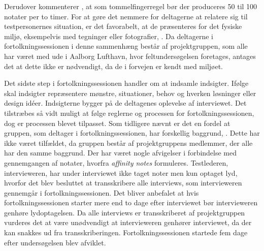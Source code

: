%
Derudover kommenterer \textcite[s. 116]{Book:CIInterpretationSession},  at som tommelfingerregel bør der produceres 50 til 100 notater per to timer. For at gøre det nemmere for deltagerne at relatere sig til testpersonernes situation, er det favorabelt, at de præsenteres for det fysiske miljø, eksempelvis med tegninger eller fotografier, \parencite[s. 119]{Book:CIInterpretationSession}. Da deltagerne i fortolkningssessionen i denne sammenhæng består af projektgruppen, som alle har været med ude i Aalborg Lufthavn, hvor feltundersøgelsen foretages, antages det at dette ikke er nødvendigt, da de i forvejen er kendt med miljøet. 

Det sidste step i fortolkningssessionen handler om at indsamle indsigter. Ifølge \textcite[s. 119]{Book:CIInterpretationSession} skal indsigter repræsentere mønstre, situationer, behov og hverken løsninger eller design idéer. Indsigterne bygger på de deltagenes oplevelse af interviewet. \blankline
%
Det tilstræbes så vidt muligt at følge reglerne og processen for fortolkningssessionen, dog er processen blevet tilpasset. Som tidligere nævnt er det en fordel at gruppen, som deltager i fortolkningssessionen, har forskellig baggrund, \parencite[s. 104]{Book:CIInterpretationSession}. Dette har ikke været tilfældet, da gruppen består af projektgruppens medlemmer, der alle har den samme baggrund. Der har været nogle afvigelser i forbindelse med gennemgangen af notater, hvorfra \textit{affinity notes} formuleres. Testlederen, intervieweren, har under interviewet ikke taget noter men kun optaget lyd, hvorfor det blev besluttet at transskribere alle interviews, som intervieweren gennemgår i fortolkningssessionen. Det bliver anbefalet at hvis fortolkningssessionen starter mere end to dage efter interviewet bør intervieweren genhøre lydoptagelsen. Da alle interviews er transskriberet af projektgruppen vurderes det at være unødvendigt at intervieweren genhører interviewet, da der kan snakkes ud fra transskriberingen. Fortolkningssessionen startede fem dage efter undersøgelsen blev afviklet. 

